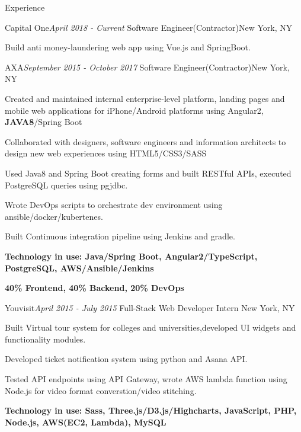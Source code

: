 \documentclass{resume} %
\begin{document}
\begin{rSection}{Experience}
\begin{rSubsection}{Capital One}{\em April 2018 - Current }{Software Engineer(Contractor)}{New York, NY}
\item Build anti money-laundering web app using Vue.js and SpringBoot.

\end{rSubsection}
\begin{rSubsection}{AXA}{\em September 2015 - October 2017 }{Software Engineer(Contractor)}{New York, NY}
\item Created and maintained internal enterprise-level platform, landing pages and mobile web applications for iPhone/Android platforms using Angular2, {\bf JAVA8}/Spring Boot
\item Collaborated with designers, software engineers and information architects to design new web experiences using HTML5/CSS3/SASS
\item Used Java8 and Spring Boot creating forms and built RESTful APIs, executed PostgreSQL queries using pgjdbc.
\item Wrote DevOps scripts to orchestrate dev environment using ansible/docker/kubertenes.
\item Built Continuous integration pipeline using Jenkins and gradle.
\item {\bf Technology in use: Java/Spring Boot, Angular2/TypeScript, PostgreSQL, AWS/Ansible/Jenkins }
\item {\bf 40\% Frontend, 40\% Backend, 20\% DevOps }

\end{rSubsection}

\begin{rSubsection}{Youvisit}{\em April 2015 - July 2015 }{Full-Stack Web Developer Intern}{ New York, NY}
\item Built Virtual tour system for colleges and universities,developed UI widgets and functionality modules.
\item Developed ticket notification system using python and Asana API.
\item Tested API endpoints using API Gateway, wrote AWS lambda function using Node.js for video format converstion/video stitching.
\item {\bf Technology in use: Sass, Three.js/D3.js/Highcharts, JavaScript, PHP, Node.js, AWS(EC2, Lambda), MySQL}


\end{rSubsection}
\end{rSection}
\end{document}
